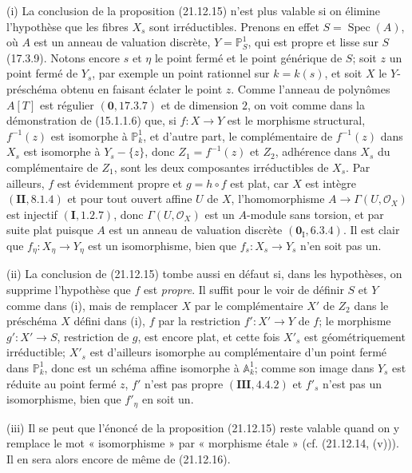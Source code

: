 \begin{remarks}[21.12.17]
\label{IV.21.12.17}
(i) La conclusion de la proposition (21.12.15) n'est plus valable si on élimine
l'hypothèse que les fibres $X_s$ sont irréductibles. Prenons en effet
$S=\operatorname{Spec}(A)$, où $A$ est un anneau de valuation discrète,
$Y=\mathbb P^1_S$, qui est propre et lisse sur $S$ (17.3.9). Notons encore $s$ et
$\eta$ le point fermé et le point générique de $S$; soit $z$ un point fermé de $Y_s$,
par exemple un point rationnel sur $k=k(s)$, et soit $X$ le $Y$-préschéma obtenu en
faisant éclater le point $z$. Comme l'anneau de polynômes $A[T]$ est régulier
$(\mathbf 0, 17.3.7)$ et de dimension $2$, on voit comme dans la démonstration de
(15.1.1.6) que, si $f:X\to Y$ est le morphisme structural, $f^{-1}(z)$ est isomorphe
à $\mathbb P^1_k$, et d'autre part, le complémentaire de $f^{-1}(z)$ dans $X_s$ est
isomorphe à $Y_s-\{z\}$, donc $Z_1=f^{-1}(z)$ et $Z_2$, adhérence dans $X_s$ du
complémentaire de $Z_1$, sont les deux composantes irréductibles de $X_s$. Par
ailleurs, $f$ est évidemment propre et $g=h\circ f$ est plat, car $X$ est intègre
$(\mathbf{II}, 8.1.4)$ et pour tout ouvert affine $U$ de $X$, l'homomorphisme
$A\to\Gamma(U,\mathcal O_X)$ est injectif $(\mathbf I, 1.2.7)$, donc
$\Gamma(U,\mathcal O_X)$ est un $A$-module sans torsion, et par suite plat puisque $A$
est un anneau de valuation discrète $(\mathbf 0_{\mathrm I}, 6.3.4)$. Il est clair que
$f_\eta:X_\eta\to Y_\eta$ est un isomorphisme, bien que
$f_s:X_s\to Y_s$ n'en soit pas un.

(ii) La conclusion de (21.12.15) tombe aussi en défaut si, dans les hypothèses, on
supprime l'hypothèse que $f$ est \emph{propre}. Il suffit pour le voir de définir $S$ et
$Y$ comme dans (i), mais de remplacer $X$ par le complémentaire $X'$ de $Z_2$ dans le
préschéma $X$ défini dans (i), $f$ par la restriction $f':X'\to Y$ de $f$; le morphisme
$g':X'\to S$, restriction de $g$, est encore plat, et cette fois $X'_s$ est
géométriquement irréductible; $X'_s$ est d'ailleurs isomorphe au complémentaire d'un
point fermé dans $\mathbb P^1_k$, donc est un schéma affine isomorphe à $\mathbb A^1_k$;
comme son image dans $Y_s$ est réduite au point fermé $z$, $f'$ n'est pas propre
$(\mathbf{III}, 4.4.2)$ et $f'_s$ n'est pas un isomorphisme, bien que $f'_\eta$ en soit
un.

(iii) Il se peut que l'énoncé de la proposition (21.12.15) reste valable quand on y
remplace le mot « isomorphisme » par « morphisme étale » (cf. (21.12.14, (v))). Il en
sera alors encore de même de (21.12.16).
\end{remarks}

